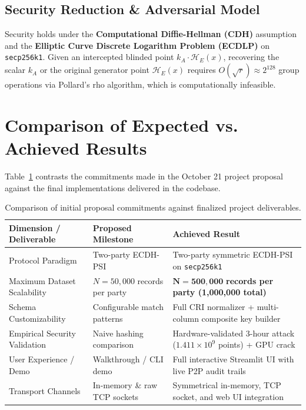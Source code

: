 \documentclass[10pt,a4paper]{article}
\begin{document}
\subsection{Security Reduction \& Adversarial Model}
Security holds under the \textbf{Computational Diffie-Hellman (CDH)} assumption and the \textbf{Elliptic Curve Discrete Logarithm Problem (ECDLP)} on \texttt{secp256k1}. Given an intercepted blinded point $k_A \cdot \mathcal{H}_E(x)$, recovering the scalar $k_A$ or the original generator point $\mathcal{H}_E(x)$ requires $O(\sqrt{r}) \approx 2^{128}$ group operations via Pollard's rho algorithm, which is computationally infeasible.

\section{Comparison of Expected vs. Achieved Results}
Table~\ref{tab:comparison} contrasts the commitments made in the October 21 project proposal against the final implementations delivered in the codebase.

\begin{table}[h!]
\centering
\small
\begin{tabular}{@{}lll@{}}
\toprule
\textbf{Dimension / Deliverable} & \textbf{Proposed Milestone} & \textbf{Achieved Result} \\ \midrule
Protocol Paradigm & Two-party ECDH-PSI & Two-party symmetric ECDH-PSI on \texttt{secp256k1} \\
Maximum Dataset Scalability & $N = 50{,}000$ records per party & $\mathbf{N = 500{,}000}$ \textbf{records per party (1,000,000 total)} \\
Schema Customizability & Configurable match patterns & Full CRI normalizer + multi-column composite key builder \\
Empirical Security Validation & Naive hashing comparison & Hardware-validated 3-hour attack ($1.411 \times 10^9$ points) + GPU crack \\
User Experience / Demo & Walkthrough / CLI demo & Full interactive Streamlit UI with live P2P audit trails \\
Transport Channels & In-memory \& raw TCP sockets & Symmetrical in-memory, TCP socket, and web UI integration \\ \bottomrule
\end{tabular}
\caption{Comparison of initial proposal commitments against finalized project deliverables.}
\label{tab:comparison}
\end{table}
\end{document}
